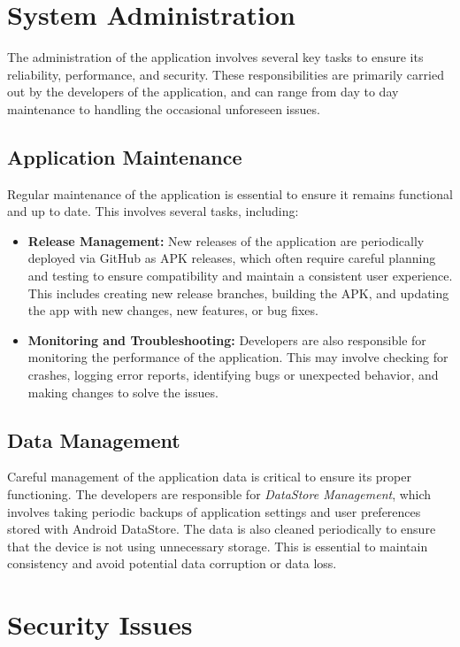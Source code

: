 \section{System Administration}

The administration of the application involves several key tasks to ensure its reliability, performance, and security. These responsibilities are primarily carried out by the developers of the application, and can range from day to day maintenance to handling the occasional unforeseen issues.

\subsection{Application Maintenance}

Regular maintenance of the application is essential to ensure it remains functional and up to date. This involves several tasks, including:

\begin{itemize}
    \item \textbf{Release Management:} New releases of the application are periodically deployed via GitHub as APK releases, which often require careful planning and testing to ensure compatibility and maintain a consistent user experience. This includes creating new release branches, building the APK, and updating the app with new changes, new features, or bug fixes.
    \item \textbf{Monitoring and Troubleshooting:} Developers are also responsible for monitoring the performance of the application. This may involve checking for crashes, logging error reports, identifying bugs or unexpected behavior, and making changes to solve the issues.
\end{itemize}

\subsection{Data Management}

Careful management of the application data is critical to ensure its proper functioning.  The developers are responsible for \textit{DataStore Management}, which involves taking periodic backups of application settings and user preferences stored with Android DataStore. The data is also cleaned periodically to ensure that the device is not using unnecessary storage. This is essential to maintain consistency and avoid potential data corruption or data loss.

\section{Security Issues}
